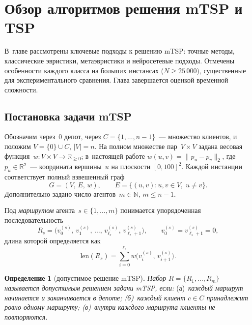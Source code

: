 \documentclass[a4paper,14pt]{extreport}
\begin{document}
\chapter{Обзор алгоритмов решения mTSP и TSP}

В~главе рассмотрены ключевые подходы к решению mTSP: точные методы, классические эвристики, метаэвристики и нейросетевые подходы. Отмечены особенности каждого класса на больших инстансах ($N \geq 25\,000$), существенные для экспериментального сравнения. Глава завершается оценкой временной сложности.

\section{Постановка задачи mTSP}
\label{sec:mtsp-statement}

Обозначим через~$0$ депот, через $C=\{1,\dots,n-1\}$~--- множество клиентов, и положим $V=\{0\}\cup C$, $|V|=n$. На полном множестве пар~$V\times V$ задана весовая функция~$w:V\times V\to\mathbb{R}_{\geq 0}$; в~настоящей работе $w(u,v)=\lVert p_u-p_v\rVert_2$, где $p_u\in\mathbb{R}^2$~--- координата вершины~$u$ на плоскости $[0,100]^2$. Каждой инстанции соответствует полный взвешенный граф
\begin{equation}
G=(V,\,E,\,w),\qquad E=\bigl\{(u,v):u,v\in V,\;u\neq v\bigr\}.
\label{eq:graph}
\end{equation}
Дополнительно задано число агентов~$m\in\mathbb{N}$, $m\leq n-1$.

Под \emph{маршрутом} агента~$s\in\{1,\dots,m\}$ понимается упорядоченная последовательность
\[
R_s=\bigl(v^{(s)}_0,\,v^{(s)}_1,\,\dots,\,v^{(s)}_{\ell_s},\,v^{(s)}_{\ell_s+1}\bigr),\qquad v^{(s)}_0=v^{(s)}_{\ell_s+1}=0,
\]
длина которой определяется как
\begin{equation}
\mathrm{len}(R_s)=\sum_{i=0}^{\ell_s}w\!\bigl(v^{(s)}_i,\,v^{(s)}_{i+1}\bigr).
\label{eq:route-length}
\end{equation}

\medskip
\noindent\textbf{Определение 1} (допустимое решение mTSP)\textbf{.} \emph{Набор $R=\{R_1,\dots,R_m\}$ называется допустимым решением задачи mTSP, если:} (а)~\emph{каждый маршрут начинается и заканчивается в депоте; (б)~каждый клиент $c\in C$ принадлежит ровно одному маршруту; (в)~внутри каждого маршрута клиенты не повторяются.}
\end{document}
